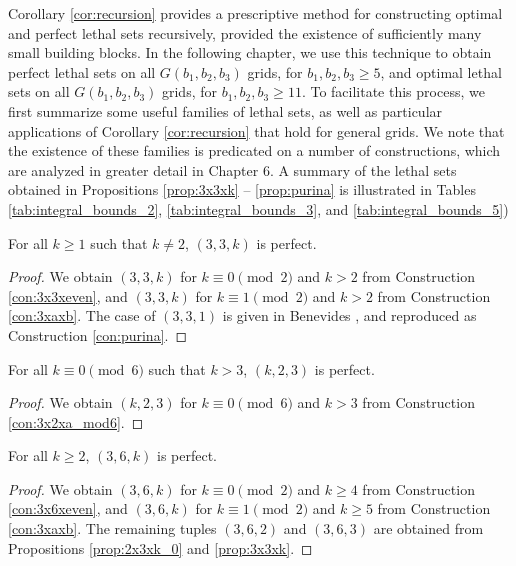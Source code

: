 Corollary \ref{cor:recursion} provides a prescriptive method for constructing optimal and perfect lethal sets recursively, provided the existence of sufficiently many small building blocks. In the following chapter, we use this technique to obtain perfect lethal sets on all $G(b_1,b_2,b_3)$ grids, for $b_1,b_2,b_3 \geq 5$, and optimal lethal sets on all $G(b_1,b_2,b_3)$ grids, for $b_1,b_2,b_3 \geq 11$. To facilitate this process, we first summarize some useful families of lethal sets, as well as particular applications of Corollary \ref{cor:recursion} that hold for general grids. We note that the existence of these families is predicated on a number of constructions, which are analyzed in greater detail in Chapter 6. A summary of the lethal sets obtained in Propositions \ref{prop:3x3xk} -- \ref{prop:purina} is illustrated in Tables \ref{tab:integral_bounds_2}, \ref{tab:integral_bounds_3}, and \ref{tab:integral_bounds_5})

\begin{prop}
\label{prop:3x3xk}
For all $k \geq 1$ such that $k \neq 2$, $(3,3,k)$ is perfect.
\end{prop}

\begin{proof}
We obtain $(3,3,k)$ for $k \equiv 0 \pmod 2$ and $k > 2$ from Construction \ref{con:3x3xeven}, and $(3,3,k)$ for $k \equiv 1 \pmod 2$ and $k > 2$ from Construction \ref{con:3xaxb}. The case of $(3,3,1)$ is given in Benevides \cite{benevides:2021}, and reproduced as Construction \ref{con:purina}.
\end{proof}

\begin{prop}
\label{prop:2x3xk_0}
For all $k \equiv 0 \pmod 6$ such that $k>3$, $(k,2,3)$ is perfect.
\end{prop}

\begin{proof}
We obtain $(k,2,3)$ for $k \equiv 0 \pmod 6$ and $k > 3$ from Construction \ref{con:3x2xa_mod6}. 
\end{proof}

\begin{prop}
\label{prop:3x6xk}
For all $k \geq 2$, $(3,6,k)$ is perfect.
\end{prop}

\begin{proof}
We obtain $(3,6,k)$ for $k \equiv 0 \pmod 2$ and $k \geq 4$ from Construction \ref{con:3x6xeven}, and $(3,6,k)$ for $k \equiv 1 \pmod 2$ and $k \geq 5$ from Construction \ref{con:3xaxb}. The remaining tuples $(3,6,2)$ and $(3,6,3)$ are obtained from Propositions \ref{prop:2x3xk_0} and \ref{prop:3x3xk}.
\end{proof}

